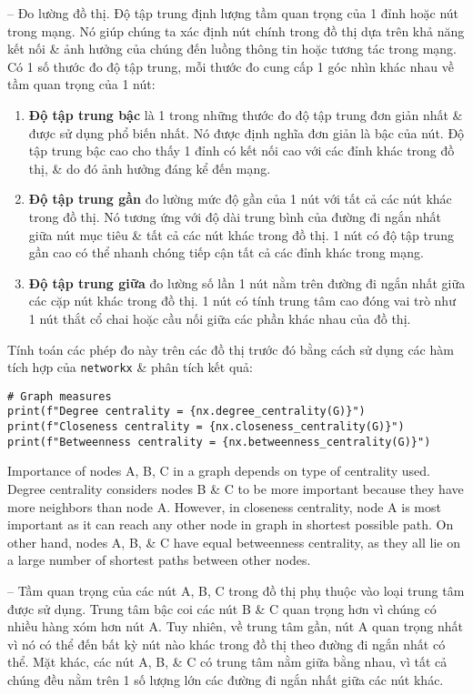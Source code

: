 \documentclass{article}
\begin{document}
\begin{itemize}
\begin{itemize}
\begin{itemize}
            -- {\sf Đo lường đồ thị.} Độ tập trung định lượng tầm quan trọng của 1 đỉnh hoặc nút trong mạng. Nó giúp chúng ta xác định nút chính trong đồ thị dựa trên khả năng kết nối \& ảnh hưởng của chúng đến luồng thông tin hoặc tương tác trong mạng. Có 1 số thước đo độ tập trung, mỗi thước đo cung cấp 1 góc nhìn khác nhau về tầm quan trọng của 1 nút:
            \begin{enumerate}
                \item {\bf Độ tập trung bậc} là 1 trong những thước đo độ tập trung đơn giản nhất \& được sử dụng phổ biến nhất. Nó được định nghĩa đơn giản là bậc của nút. Độ tập trung bậc cao cho thấy 1 đỉnh có kết nối cao với các đỉnh khác trong đồ thị, \& do đó ảnh hưởng đáng kể đến mạng.
                \item {\bf Độ tập trung gần} đo lường mức độ gần của 1 nút với tất cả các nút khác trong đồ thị. Nó tương ứng với độ dài trung bình của đường đi ngắn nhất giữa nút mục tiêu \& tất cả các nút khác trong đồ thị. 1 nút có độ tập trung gần cao có thể nhanh chóng tiếp cận tất cả các đỉnh khác trong mạng.
                \item {\bf Độ tập trung giữa} đo lường số lần 1 nút nằm trên đường đi ngắn nhất giữa các cặp nút khác trong đồ thị. 1 nút có tính trung tâm cao đóng vai trò như 1 nút thắt cổ chai hoặc cầu nối giữa các phần khác nhau của đồ thị.
            \end{enumerate}
            Tính toán các phép đo này trên các đồ thị trước đó bằng cách sử dụng các hàm tích hợp của {\tt networkx} \& phân tích kết quả:
            \begin{verbatim}
# Graph measures
print(f"Degree centrality = {nx.degree_centrality(G)}")
print(f"Closeness centrality = {nx.closeness_centrality(G)}")
print(f"Betweenness centrality = {nx.betweenness_centrality(G)}")
            \end{verbatim}
            Importance of nodes A, B, C in a graph depends on type of centrality used. Degree centrality considers nodes B \& C to be more important because they have more neighbors than node A. However, in closeness centrality, node A is most important as it can reach any other node in graph in shortest possible path. On other hand, nodes A, B, \& C have equal betweenness centrality, as they all lie on a large number of shortest paths between other nodes.

            -- Tầm quan trọng của các nút A, B, C trong đồ thị phụ thuộc vào loại trung tâm được sử dụng. Trung tâm bậc coi các nút B \& C quan trọng hơn vì chúng có nhiều hàng xóm hơn nút A. Tuy nhiên, về trung tâm gần, nút A quan trọng nhất vì nó có thể đến bất kỳ nút nào khác trong đồ thị theo đường đi ngắn nhất có thể. Mặt khác, các nút A, B, \& C có trung tâm nằm giữa bằng nhau, vì tất cả chúng đều nằm trên 1 số lượng lớn các đường đi ngắn nhất giữa các nút khác.


\end{itemize}
\end{itemize}
\end{itemize}
\end{document}
